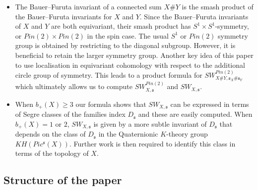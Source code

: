 \documentclass{amsart}
\theoremstyle{definition}
\theoremstyle{remark}
\numberwithin{equation}{section}
\begin{document}
\begin{itemize}
\item[(6)]{The Bauer--Furuta invariant of a connected sum $X \# Y$ is the smash product of the Bauer--Furuta invariants for $X$ and $Y$. Since the Bauer--Furuta invariants of $X$ and $Y$ are both equivariant, their smash product has $S^1 \times S^1$-symmetry, or $Pin(2) \times Pin(2)$ in the spin case. The usual $S^1$ or $Pin(2)$ symmetry group is obtained by restricting to the diagonal subgroup. However, it is beneficial to retain the larger symmetry group. Another key idea of this paper to use localisation in equivariant cohomology with respect to the additional circle group of symmetry. This leads to a product formula for $SW_{X\#Y , \mathfrak{s}_X \# \mathfrak{s}_Y}^{Pin(2)}$ which ultimately allows us to compute $SW_{X,\mathfrak{s}}^{Pin(2)}$ and $SW_{X,\mathfrak{s}}$.}
\item[(7)]{When $b_+(X) \ge 3$ our formula shows that $SW_{X , \mathfrak{s}}$ can be expressed in terms of Segre classes of the families index $D_{\mathfrak{s}}$ and these are easily computed. When $b_+(X) = 1$ or $2$, $SW_{X , \mathfrak{s}}$ is given by a more subtle invariant of $D_{\mathfrak{s}}$ that depends on the class of $D_{\mathfrak{s}}$ in the Quaternionic $K$-theory group $KH( Pic^{\mathfrak{s}}(X) )$. Further work is then required to identify this class in terms of the topology of $X$.}
\end{itemize}





\subsection{Structure of the paper}
\end{document}

